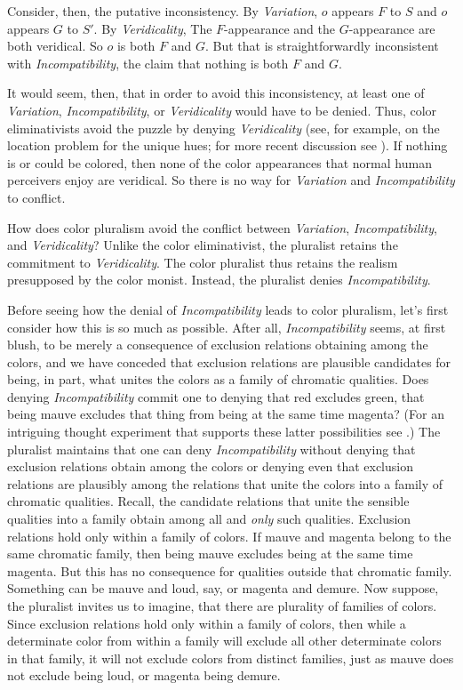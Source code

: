 \documentclass[12pt]{article}
\begin{document}
Consider, then, the putative inconsistency. By \emph{Variation}, \( o \) appears \( F \) to \( S \) and \( o \) appears \( G \) to \( S' \). By \emph{Veridicality}, The \( F \)-appearance and the \( G \)-appearance are both veridical. So \( o \) is both \( F \) and \( G \). But that is straightforwardly inconsistent with \emph{Incompatibility}, the claim that nothing is both \( F \) and \( G \). 

It would seem, then, that in order to avoid this inconsistency, at least one of \emph{Variation}, \emph{Incompatibility}, or \emph{Veridicality} would have to be denied. Thus, color eliminativists avoid the puzzle by denying \emph{Veridicality} (see, for example, \citealt{Hardin:1993kn} on the location problem for the unique hues; for more recent discussion see \citealt{Gatzia:2010ga}). If nothing is or could be colored, then none of the color appearances that normal human perceivers enjoy are veridical. So there is no way for \emph{Variation} and \emph{Incompatibility} to conflict.

How does color pluralism avoid the conflict between \emph{Variation}, \emph{Incompatibility}, and \emph{Veridicality}? Unlike the color eliminativist, the pluralist retains the commitment to \emph{Veridicality}. The color pluralist thus retains the realism presupposed by the color monist. Instead, the pluralist denies \emph{Incompatibility}.

Before seeing how the denial of \emph{Incompatibility} leads to color pluralism, let's first consider how this is so much as possible. After all, \emph{Incompatibility} seems, at first blush, to be merely a consequence of exclusion relations obtaining among the colors, and we have conceded that exclusion relations are plausible candidates for being, in part, what unites the colors as a family of chromatic qualities. Does denying \emph{Incompatibility} commit one to denying that red excludes green, that being mauve excludes that thing from being at the same time magenta? (For an intriguing thought experiment that supports these latter possibilities see \citealt{Harman:2001mv}.) The pluralist maintains that one can deny \emph{Incompatibility} without denying that exclusion relations obtain among the colors or denying even that exclusion relations are plausibly among the relations that unite the colors into a family of chromatic qualities. Recall, the candidate relations that unite the sensible qualities into a family obtain among all and \emph{only} such qualities. Exclusion relations hold only within a family of colors. If mauve and magenta belong to the same chromatic family, then being mauve excludes being at the same time magenta. But this has no consequence for qualities outside that chromatic family. Something can be mauve and loud, say, or magenta and demure. Now suppose, the pluralist invites us to imagine, that there are plurality of families of colors. Since exclusion relations hold only within a family of colors, then while a determinate color from within a family will exclude all other determinate colors in that family, it will not exclude colors from distinct families, just as mauve does not exclude being loud, or magenta being demure.
\end{document}
